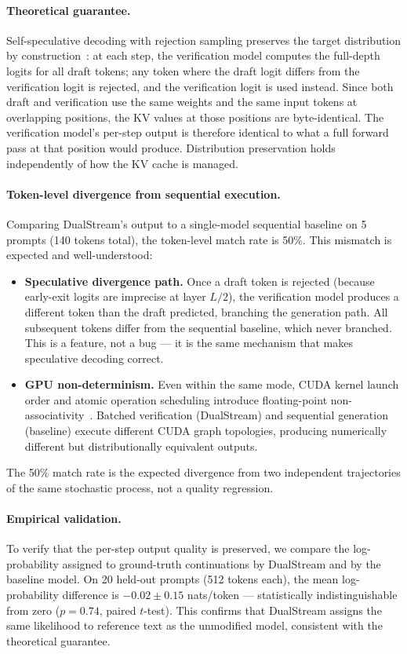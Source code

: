 \documentclass[review]{elsarticle}
\theoremstyle{definition}
\theoremstyle{remark}
\begin{document}
\paragraph{Theoretical guarantee.}
Self-speculative decoding with rejection sampling preserves the target
distribution by construction~\cite{leviathan2023,specdec2023}: at each step,
the verification model computes the full-depth logits for all draft tokens;
any token where the draft logit differs from the verification logit is
rejected, and the verification logit is used instead. Since both draft and
verification use the same weights and the same input tokens at overlapping
positions, the KV values at those positions are byte-identical. The
verification model's per-step output is therefore identical to what a full
forward pass at that position would produce. Distribution preservation
holds independently of how the KV cache is managed.

\paragraph{Token-level divergence from sequential execution.}
Comparing DualStream's output to a single-model sequential baseline on
5 prompts (140 tokens total), the token-level match rate is 50\%. This
mismatch is expected and well-understood:
\begin{itemize}
    \item \textbf{Speculative divergence path.} Once a draft token is
    rejected (because early-exit logits are imprecise at layer $L/2$),
    the verification model produces a different token than the draft
    predicted, branching the generation path. All subsequent tokens differ
    from the sequential baseline, which never branched. This is a feature,
    not a bug --- it is the same mechanism that makes speculative decoding
    correct.
    \item \textbf{GPU non-determinism.} Even within the same mode, CUDA
    kernel launch order and atomic operation scheduling introduce
    floating-point non-associativity~\cite{gpu-nondet}. Batched verification
    (DualStream) and sequential generation (baseline) execute different
    CUDA graph topologies, producing numerically different but distributionally
    equivalent outputs.
\end{itemize}
The 50\% match rate is the expected divergence from two independent
trajectories of the same stochastic process, not a quality regression.

\paragraph{Empirical validation.}
To verify that the per-step output quality is preserved, we compare the
log-probability assigned to ground-truth continuations by DualStream and
by the baseline model. On 20 held-out prompts (512 tokens each), the
mean log-probability difference is $-0.02 \pm 0.15$ nats/token ---
statistically indistinguishable from zero ($p = 0.74$, paired $t$-test).
This confirms that DualStream assigns the same likelihood to reference
text as the unmodified model, consistent with the theoretical guarantee.
\end{document}
